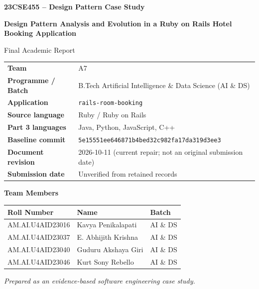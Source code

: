 \documentclass[10pt,a4paper]{article}
\newcommand{\code}[1]{\texttt{\small #1}}
\begin{document}
\hypersetup{pageanchor=false}
\begin{titlepage}
\centering
\vspace*{1.0cm}
{\Large\bfseries 23CSE455 -- Design Pattern Case Study\par}
\vspace{1.2cm}
{\LARGE\bfseries Design Pattern Analysis and Evolution in a Ruby on Rails Hotel Booking Application\par}
\vspace{1.4cm}
{\large Final Academic Report\par}
\vspace{1.2cm}

\begin{tabular}{ll}
\textbf{Team} & A7\\
\textbf{Programme / Batch} & B.Tech Artificial Intelligence \& Data Science (AI \& DS)\\
\textbf{Application} & \code{rails-room-booking}\\
\textbf{Source language} & Ruby / Ruby on Rails\\
\textbf{Part 3 languages} & Java, Python, JavaScript, C++\\
\textbf{Baseline commit} & \code{5e15551ee646871b4bed32c982fa17da319d3ee3}\\
\textbf{Document revision} & 2026-10-11 (current repair; not an original submission date)\\
\textbf{Submission date} & Unverified from retained records
\end{tabular}

\vfill
{\large\bfseries Team Members\par}
\vspace{0.3cm}
\begin{tabular}{lll}
\toprule
Roll Number & Name & Batch\\
\midrule
AM.AI.U4AID23016 & Kavya Penikalapati & AI \& DS\\
AM.AI.U4AID23037 & E. Abhijith Krishna & AI \& DS\\
AM.AI.U4AID23040 & Guduru Akshaya Giri & AI \& DS\\
AM.AI.U4AID23046 & Kurt Sony Rebello & AI \& DS\\
\bottomrule
\end{tabular}

\vfill
\textit{Prepared as an evidence-based software engineering case study.}
\end{titlepage}

\hypersetup{pageanchor=true}
\cfoot{\thepage}
\tableofcontents
\clearpage
\listoffigures
\clearpage
\listoftables
\clearpage
{}
\end{document}
